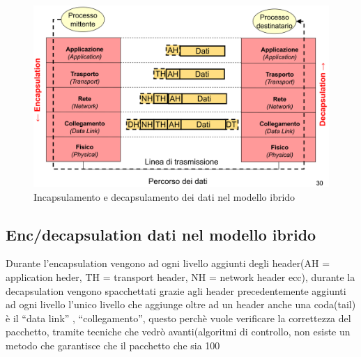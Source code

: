     \begin{figure}[h!]
    \centering
    \includegraphics[width=1.2\textwidth]{images/enc_dec_ibrido.png}
    \caption{Incapsulamento e decapsulamento dei dati nel modello ibrido}
    \label{fig:modello_ibrido_enc_decapsulamento}
\end{figure}

\subsection{Enc/decapsulation dati nel modello ibrido}
Durante l'encapsulation vengono ad ogni livello aggiunti degli header(AH = application heder, TH = transport header, NH = network header ecc), durante la decapsulation vengono spacchettati grazie agli header precedentemente aggiunti ad ogni livello
l'unico livello che aggiunge oltre ad un header anche una coda(tail) è il “data link” , “collegamento”, questo perchè vuole verificare la correttezza del pacchetto, tramite tecniche che vedrò avanti(algoritmi di controllo, non esiste un metodo che garantisce che il pacchetto che sia 100%


